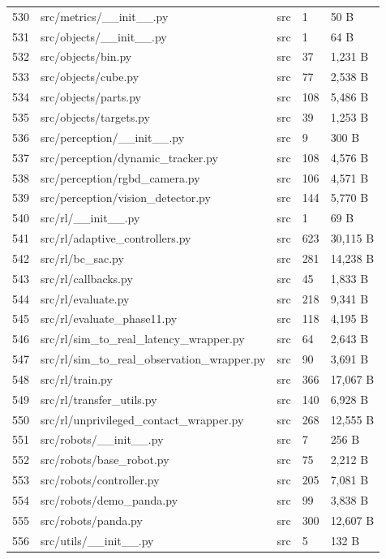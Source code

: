 \documentclass[11pt,a4paper,oneside]{book}
\begin{document}
\begin{longtable}{l l l l l}
530 & src/metrics/\_\_init\_\_.py & src & 1 & 50 B \\
531 & src/objects/\_\_init\_\_.py & src & 1 & 64 B \\
532 & src/objects/bin.py & src & 37 & 1,231 B \\
533 & src/objects/cube.py & src & 77 & 2,538 B \\
534 & src/objects/parts.py & src & 108 & 5,486 B \\
535 & src/objects/targets.py & src & 39 & 1,253 B \\
536 & src/perception/\_\_init\_\_.py & src & 9 & 300 B \\
537 & src/perception/dynamic\_tracker.py & src & 108 & 4,576 B \\
538 & src/perception/rgbd\_camera.py & src & 106 & 4,571 B \\
539 & src/perception/vision\_detector.py & src & 144 & 5,770 B \\
540 & src/rl/\_\_init\_\_.py & src & 1 & 69 B \\
541 & src/rl/adaptive\_controllers.py & src & 623 & 30,115 B \\
542 & src/rl/bc\_sac.py & src & 281 & 14,238 B \\
543 & src/rl/callbacks.py & src & 45 & 1,833 B \\
544 & src/rl/evaluate.py & src & 218 & 9,341 B \\
545 & src/rl/evaluate\_phase11.py & src & 118 & 4,195 B \\
546 & src/rl/sim\_to\_real\_latency\_wrapper.py & src & 64 & 2,643 B \\
547 & src/rl/sim\_to\_real\_observation\_wrapper.py & src & 90 & 3,691 B \\
548 & src/rl/train.py & src & 366 & 17,067 B \\
549 & src/rl/transfer\_utils.py & src & 140 & 6,928 B \\
550 & src/rl/unprivileged\_contact\_wrapper.py & src & 268 & 12,555 B \\
551 & src/robots/\_\_init\_\_.py & src & 7 & 256 B \\
552 & src/robots/base\_robot.py & src & 75 & 2,212 B \\
553 & src/robots/controller.py & src & 205 & 7,081 B \\
554 & src/robots/demo\_panda.py & src & 99 & 3,838 B \\
555 & src/robots/panda.py & src & 300 & 12,607 B \\
556 & src/utils/\_\_init\_\_.py & src & 5 & 132 B \\

\end{longtable}
\end{document}
